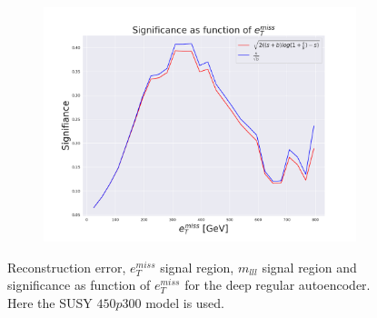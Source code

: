 \begin{figure}[H]
    \hfill 
    \begin{subfigure}{.40\textwidth}
        \includegraphics[width=\textwidth]{Figures/AE_testing/big/2lep/significance_etmiss_450p0p0300_-0.7180276969063684.pdf}
        \caption{}
        \label{fig:AE_2lep_big_signi_450_3}
    \end{subfigure}
    \hfill      
    \caption[2lep deep network | $450p300$ | AE | 3]{Reconstruction error, $e_T^{miss}$ signal region, $m_{lll}$ signal region and significance as function of 
    $e_T^{miss}$ for the deep regular autoencoder. Here the SUSY $450p300$ model is used.}
    \label{fig:AE_2lep_big_rec_sig_signi_450_3}
\end{figure}

